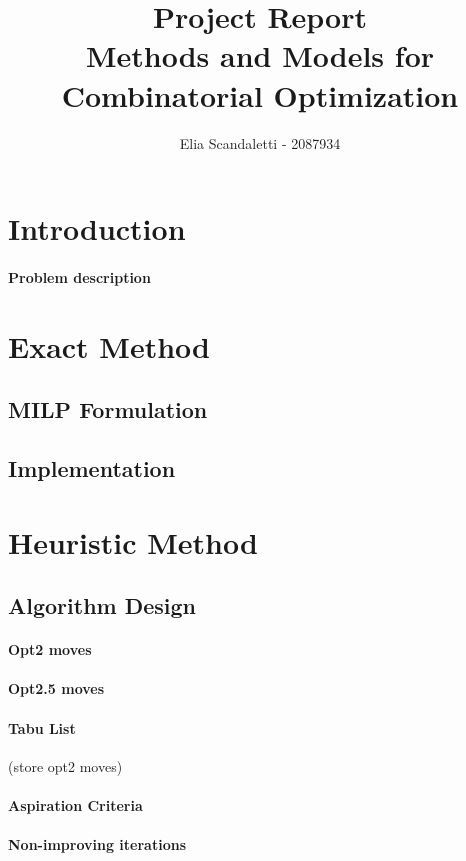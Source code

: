 \documentclass{article}
\title{
    Project Report
    \\ \Large
    Methods and Models for Combinatorial Optimization 
    }
\author{Elia Scandaletti - 2087934}
\begin{document}
\maketitle

\section{Introduction}
\paragraph{Problem description}

\section{Exact Method}

\subsection{MILP Formulation}

\subsection{Implementation}

\section{Heuristic Method}

\subsection{Algorithm Design}
\paragraph{Opt2 moves}
\paragraph{Opt2.5 moves}
\paragraph{Tabu List} (store opt2 moves)
\paragraph{Aspiration Criteria}
\paragraph{Non-improving iterations}
\end{document}
